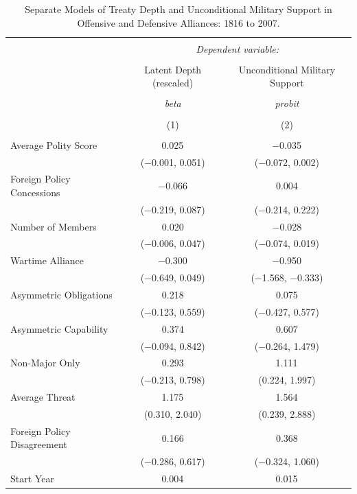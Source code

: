 \documentclass[12pt]{article}
\begin{document}
\begin{table}[!htbp] \centering 
  \caption{Separate Models of Treaty Depth and Unconditional Military Support in Offensive and Defensive Alliances: 1816 to 2007.} 
  \label{tab:separate-models} 
\begin{tabular}{@{\extracolsep{5pt}}lcc} 
\\[-1.8ex]\hline 
\hline \\[-1.8ex] 
 & \multicolumn{2}{c}{\textit{Dependent variable:}} \\ 
\cline{2-3} 
\\[-1.8ex] & Latent Depth (rescaled) & Unconditional Military Support \\ 
\\[-1.8ex] & \textit{beta} & \textit{probit} \\ 
\\[-1.8ex] & (1) & (2)\\ 
\hline \\[-1.8ex] 
 Average Polity Score & 0.025$^{}$ & $-$0.035$^{}$ \\ 
  & ($-$0.001, 0.051) & ($-$0.072, 0.002) \\ 
  Foreign Policy Concessions & $-$0.066 & 0.004 \\ 
  & ($-$0.219, 0.087) & ($-$0.214, 0.222) \\ 
  Number of Members & 0.020 & $-$0.028 \\ 
  & ($-$0.006, 0.047) & ($-$0.074, 0.019) \\ 
  Wartime Alliance & $-$0.300$^{}$ & $-$0.950$^{}$ \\ 
  & ($-$0.649, 0.049) & ($-$1.568, $-$0.333) \\ 
  Asymmetric Obligations & 0.218 & 0.075 \\ 
  & ($-$0.123, 0.559) & ($-$0.427, 0.577) \\ 
  Asymmetric Capability & 0.374 & 0.607 \\ 
  & ($-$0.094, 0.842) & ($-$0.264, 1.479) \\ 
  Non-Major Only & 0.293 & 1.111$^{}$ \\ 
  & ($-$0.213, 0.798) & (0.224, 1.997) \\ 
  Average Threat & 1.175$^{}$ & 1.564$^{}$ \\ 
  & (0.310, 2.040) & (0.239, 2.888) \\ 
  Foreign Policy Disagreement & 0.166 & 0.368 \\ 
  & ($-$0.286, 0.617) & ($-$0.324, 1.060) \\ 
  Start Year & 0.004$^{}$ & 0.015$^{}$ \\ 

\end{tabular}
\end{table}
\end{document}
